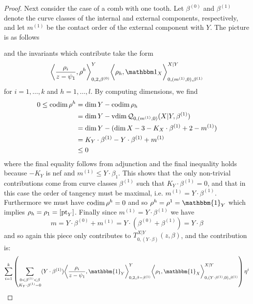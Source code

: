 \begin{proof}
Next consider the case of a comb with one tooth. Let $\beta^{(0)}$ and $\beta^{(1)}$ denote the curve classes of the internal and external components, respectively, and let $m^{(1)}$ be the contact order of the external component with $Y$. The picture is as follows
\begin{center}

\end{center}
and the invariants which contribute take the form
\begin{equation*} \bigg\langle \dfrac{\rho_i}{z-\psi_1},\rho^h\bigg\rangle_{0,2,\beta^{(0)}}^Y \bigg\langle \rho_h, \mathbbm 1_{X}\bigg\rangle_{0,(m^{(1)},0),\beta^{(1)}}^{X|Y} \end{equation*}
for $i = 1, \ldots, k$ and $h = 1, \ldots, l$. By computing dimensions, we find
\begin{align*}
0\leq \operatorname{codim} \rho^h &= \dim Y-\operatorname{codim} \rho_h \\
&= \dim Y-\operatorname{vdim} \mathcal{Q}_{0,(m^{(1)},0)}(X|Y,\beta^{(1)}) \\
&= \dim Y-(\dim X-3-K_{X}\cdot \beta^{(1)}+2-m^{(1)})\\
&= K_Y \cdot \beta^{(1)} - Y \cdot \beta^{(1)}+m^{(1)} \\
&\leq 0
\end{align*}
where the final equality follows from adjunction and the final inequality holds because $-K_Y$ is nef and $m^{(1)}\leq Y \cdot \beta_1$. This shows that the only non-trivial contributions come from curve classes $\beta^{(1)}$ such that $K_Y \cdot \beta^{(1)}=0$, and that in this case the order of tangency must be maximal, i.e. $m^{(1)}=Y \cdot \beta^{(1)}$. Furthermore we must have $\operatorname{codim} \rho^h = 0$ and so $\rho^h = \rho^1 = \mathbbm{1}_Y$ which implies $\rho_h = \rho_1 = [\operatorname{pt}_Y]$. Finally since $m^{(1)}=Y \cdot \beta^{(1)}$ we have
\begin{equation*} m = Y \cdot \beta^{(0)}+m^{(1)}=Y \cdot (\beta^{(0)} + \beta^{(1)}) = Y \cdot \beta \end{equation*}
and so again this piece only contributes to $T_{0,(Y\cdot\beta)}^{X|Y}(z,\beta)$, and the contribution is:
\begin{equation*} \sum_{i=1}^k \left( \sum_{\substack{0 < \beta^{(1)} < \beta \\ K_Y \cdot \beta^{(1)}=0}} (Y \cdot \beta^{(1)}) \bigg\langle \dfrac{\rho_i}{z-\psi_1}, \mathbbm{1}_Y \bigg\rangle_{0,2,\beta-\beta^{(1)}}^Y \bigg\langle \rho_1, \mathbbm{1}_X \bigg\rangle_{0,(Y \cdot \beta^{(1)},0),\beta^{(1)}}^{X|Y} \right) \eta^i \end{equation*}

\end{proof}
